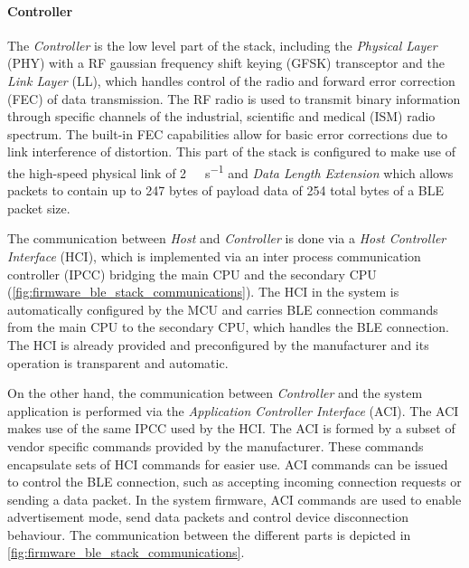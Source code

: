 \paragraph{Controller}

The \textit{Controller} is the low level part of the stack, including the \textit{Physical Layer} (PHY) with a RF gaussian frequency shift keying (GFSK) transceptor and the \textit{Link Layer} (LL), which handles control of the radio and forward error correction (FEC) of data transmission. The RF radio is used to transmit binary information through specific channels of the industrial, scientific and medical (ISM) radio spectrum. The built-in FEC capabilities allow for basic error corrections due to link interference of distortion. This part of the stack is configured to make use of the high-speed physical link of \SI{2}{\mega\bit\per\second} and \textit{Data Length Extension} which allows packets to contain up to 247 bytes of payload data of 254 total bytes of a BLE packet size.

The communication between \textit{Host} and \textit{Controller} is done via a \textit{Host Controller Interface} (HCI), which is implemented via an inter process communication controller (IPCC) bridging the main CPU and the secondary CPU (\cref{fig:firmware_ble_stack_communications}). The HCI in the system is automatically configured by the MCU and carries BLE connection commands from the main CPU to the secondary CPU, which handles the BLE connection. The HCI is already provided and preconfigured by the manufacturer and its operation is transparent and automatic.

On the other hand, the communication between \textit{Controller} and the system application is performed via the \textit{Application Controller Interface} (ACI). The ACI makes use of the same IPCC used by the HCI. The ACI is formed by a subset of vendor specific commands provided by the manufacturer. These commands encapsulate sets of HCI commands for easier use. ACI commands can be issued to control the BLE connection, such as accepting incoming connection requests or sending a data packet. In the system firmware, ACI commands are used to enable advertisement mode, send data packets and control device disconnection behaviour. The communication between the different parts is depicted in \cref{fig:firmware_ble_stack_communications}.

